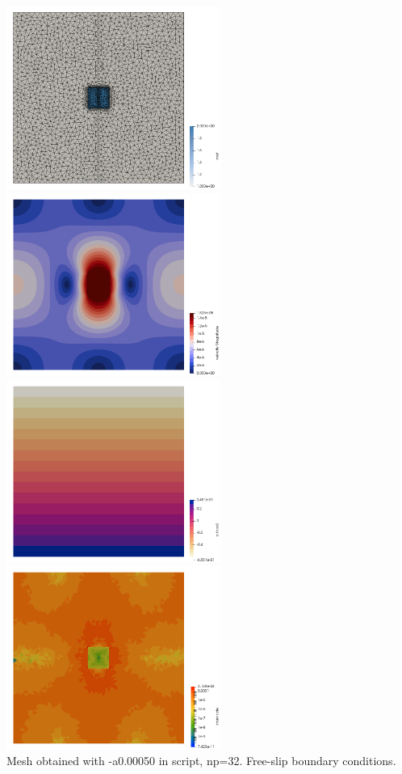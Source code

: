 \begin{center}
\includegraphics[width=7cm]{python_codes/fieldstone_93/results_exp3/grid}
\includegraphics[width=7cm]{python_codes/fieldstone_93/results_exp3/vel}\\
\includegraphics[width=7cm]{python_codes/fieldstone_93/results_exp3/press}
\includegraphics[width=7cm]{python_codes/fieldstone_93/results_exp3/sr}\\
{\captionfont  Mesh obtained with -a0.00050 in script, np=32. Free-slip boundary conditions.}
\end{center}

